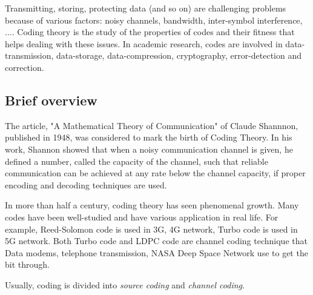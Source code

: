 Transmitting, storing, protecting data (and so on) are challenging problems because of various factors: noisy channels, bandwidth, inter-symbol interference, $\ldots$. Coding theory is the study of the properties of codes and their fitness that helps dealing with these issues. In academic research, codes are involved in data-transmission, data-storage, data-compression, cryptography, error-detection and correction. 

\subsection{Brief overview}\label{subsec:brief_overview}
The article, "A Mathematical Theory of Communication" of Claude Shannnon, published in 1948, was considered to mark the birth of Coding Theory. In his work, Shannon showed that when a noisy communication channel is given, he defined a number, called the capacity of the channel, such that reliable communication can be achieved at any rate below the channel capacity, if proper encoding and decoding techniques are used. 


In more than half a century, coding theory has seen phenomenal growth. Many codes have been well-studied and have various application in real life. For example, Reed-Solomon code is used in 3G, 4G network, Turbo code is used in 5G network. Both Turbo code and LDPC code are channel coding technique that Data modems, telephone transmission, NASA Deep Space Network use to get the bit through. 

Usually, coding is divided into \textit{source coding} and \textit{channel coding}. 

